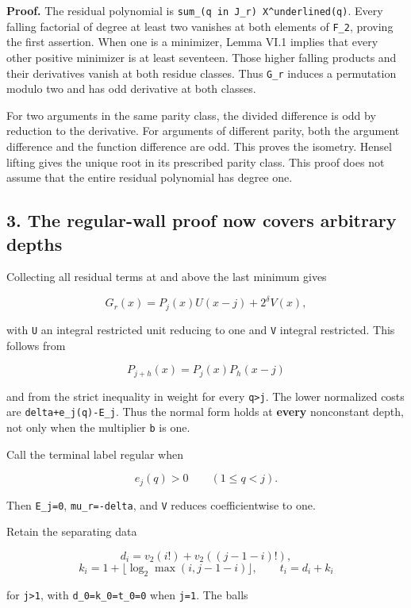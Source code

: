 \documentclass[11pt,letterpaper]{article}
\begin{document}
\textbf{Proof.} The residual polynomial is \texttt{sum\_(q\ in\ J\_r)\ X\^{}underlined(q)}. Every falling factorial of degree at least two vanishes at both elements of \texttt{F\_2}, proving the first assertion. When one is a minimizer, Lemma VI.1 implies that every other positive minimizer is at least seventeen. Those higher falling products and their derivatives vanish at both residue classes. Thus \texttt{G\_r} induces a permutation modulo two and has odd derivative at both classes.

For two arguments in the same parity class, the divided difference is odd by reduction to the derivative. For arguments of different parity, both the argument difference and the function difference are odd. This proves the isometry. Hensel lifting gives the unique root in its prescribed parity class. This proof does not assume that the entire residual polynomial has degree one.

\subsection{3. The regular-wall proof now covers arbitrary depths}\label{the-regular-wall-proof-now-covers-arbitrary-depths}

Collecting all residual terms at and above the last minimum gives

\[
\boxed{G_r(x)=P_j(x)U(x-j)+2^\delta V(x),} \tag{VI.8}
\]

with \texttt{U} an integral restricted unit reducing to one and \texttt{V} integral restricted. This follows from

\[
P_{j+h}(x)=P_j(x)P_h(x-j)
\]

and from the strict inequality in weight for every \texttt{q\textgreater{}j}. The lower normalized costs are \texttt{delta+e\_j(q)-E\_j}. Thus the normal form holds at \textbf{every} nonconstant depth, not only when the multiplier \texttt{b} is one.

Call the terminal label regular when

\[
e_j(q)>0\qquad(1\le q<j).
\]

Then \texttt{E\_j=0}, \texttt{mu\_r=-delta}, and \texttt{V} reduces coefficientwise to one.

Retain the separating data

\[
d_i=v_2(i!)+v_2((j-1-i)!),
\] \[
k_i=1+\lfloor\log_2\max(i,j-1-i)\rfloor,
\qquad t_i=d_i+k_i
\]

for \texttt{j\textgreater{}1}, with \texttt{d\_0=k\_0=t\_0=0} when \texttt{j=1}. The balls
\end{document}
